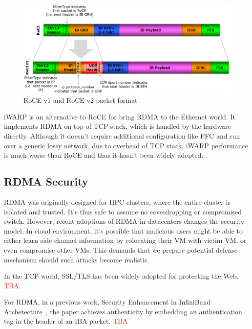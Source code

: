 \begin{figure}[ht]
    \centering
    \includegraphics[width=\textwidth]{fig/RoCE_Header_format}
    \caption{RoCE v1 and RoCE v2 packet format}
    \label{fig:roce_header_format}
\end{figure}

iWARP is an alternative to RoCE for bring RDMA to the Ethernet world. It implements RDMA on top of TCP stack, which is handled by the hardware directly.
Although it doesn't require additional configuration like PFC and run over a generic lossy network,
due to overhead of TCP stack, iWARP performance is much worse than RoCE and thus it hasn't been widely adopted.

\subsection{RDMA Security}

RDMA was originally designed for HPC clusters, where the entire cluster is isolated and trusted. It's thus safe to assume no eavesdropping or compromised switch.
However, recent adoptions of RDMA in datacenters changes the security model. In cloud environment, it's possible that malicious users might be able to either learn
side channel information by colocating their VM with victim VM, or even compromise other VMs. This demands that we prepare potential defense mechanism should such
attacks become realistic.

In the TCP world, SSL/TLS has been widely adopted for protecting the Web. \textcolor{red}{TBA}.

For RDMA, in a previous work, Security Enhancement in InfiniBand Archetecture~\cite{Lee:2005:SEI:1053727.1054449}, the paper achieves authenticity by embedding an authentication tag in the
header of an IBA packet. \textcolor{red}{TBA}
